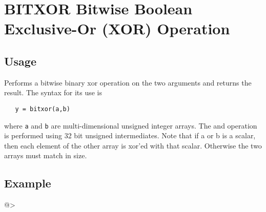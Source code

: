 \section{BITXOR Bitwise Boolean Exclusive-Or (XOR) Operation}

\subsection{Usage}

Performs a bitwise binary xor operation on the two arguments and
returns the result.  The syntax for its use is
\begin{verbatim}
   y = bitxor(a,b)
\end{verbatim}
where \verb|a| and \verb|b| are multi-dimensional unsigned integer arrays.
The and operation is performed using 32 bit unsigned intermediates.  Note that if a
or b is a scalar, then each element of the other array is xor'ed with
 that scalar.  Otherwise the two arrays must match in size.
\subsection{Example}

@>
